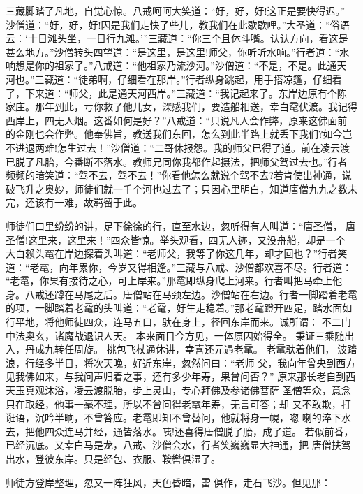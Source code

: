 三藏脚踏了凡地，自觉心惊。八戒呵呵大笑道：“好，好，好!这正是要快得迟。”
沙僧道：“好，好，好!因是我们走快了些儿，教我们在此歇歇哩。”大圣道：“俗语
云：‘十日滩头坐，一日行九滩。’”三藏道：“你三个且休斗嘴。认认方向，看这是
甚么地方。”沙僧转头四望道：“是这里，是这里!师父，你听听水响。”行者道：“水
响想是你的祖家了。”八戒道：“他祖家乃流沙河。”沙僧道：“不是，不是。此通天
河也。”三藏道：“徒弟啊，仔细看在那岸。”行者纵身跳起，用手搭凉篷，仔细看
了，下来道：“师父，此是通天河西岸。”三藏道：“我记起来了。东岸边原有个陈
家庄。那年到此，亏你救了他儿女，深感我们，要造船相送，幸白鼋伏渡。我记得
西岸上，四无人烟。这番如何是好？”八戒道：“只说凡人会作弊，原来这佛面前
的金刚也会作弊。他奉佛旨，教送我们东回，怎么到此半路上就丢下我们?如今岂
不进退两难!怎生过去！”沙僧道：“二哥休报怨。我的师父已得了道。前在凌云渡
已脱了凡胎，今番断不落水。教师兄同你我都作起摄法，把师父驾过去也。”行者
频频的暗笑道：“驾不去，驾不去！”你看他怎么就说个驾不去?若肯使出神通，说
破飞升之奥妙，师徒们就一千个河也过去了；只因心里明白，知道唐僧九九之数未
完，还该有一难，故羁留于此。

师徒们口里纷纷的讲，足下徐徐的行，直至水边，忽听得有人叫道：“唐圣僧，
唐圣僧!这里来，这里来！”四众皆惊。举头观看，四无人迹，又没舟船，却是一个
大白赖头鼋在岸边探着头叫道：“老师父，我等了你这几年，却才回也？”行者笑
道：“老鼋，向年累你，今岁又得相逢。”三藏与八戒、沙僧都欢喜不尽。行者道：
“老鼋，你果有接待之心，可上岸来。”那鼋即纵身爬上河来。行者叫把马牵上他
身。八戒还蹲在马尾之后。唐僧站在马颈左边。沙僧站在右边。行者一脚踏着老鼋
的项，一脚踏着老鼋的头叫道：“老鼋，好生走稳着。”那老鼋蹬开四足，踏水面如
行平地，将他师徒四众，连马五口，驮在身上，径回东岸而来。诚所谓：
不二门中法奥玄，诸魔战退识人天。
本来面目今方见，一体原因始得全。
秉证三乘随出入，丹成九转任周旋。
挑包飞杖通休讲，幸喜还元遇老鼋。
老鼋驮着他们，波踏浪，行经多半日，将次天晚，好近东岸，忽然问曰：“老师
父，我向年曾央到西方见我佛如来，与我问声归着之事，还有多少年寿，果曾问否？”
原来那长老自到西天玉真观沐浴，凌云渡脱胎，步上灵山，专心拜佛及参诸佛菩萨
圣僧等众，意念只在取经，他事一毫不理，所以不曾问得老鼋年寿，无言可答；却
又不敢欺，打诳语，沉吟半晌，不曾答应。老鼋即知不曾替问，他就将身一幌，唿
喇的淬下水去，把他四众连马并经，通皆落水。咦!还喜得唐僧脱了胎，成了道。
若似前番，已经沉底。又幸白马是龙，八戒、沙僧会水，行者笑巍巍显大神通，把
唐僧扶驾出水，登彼东岸。只是经包、衣服、鞍辔俱湿了。

师徒方登岸整理，忽又一阵狂风，天色昏暗，雷俱作，走石飞沙。但见那：

